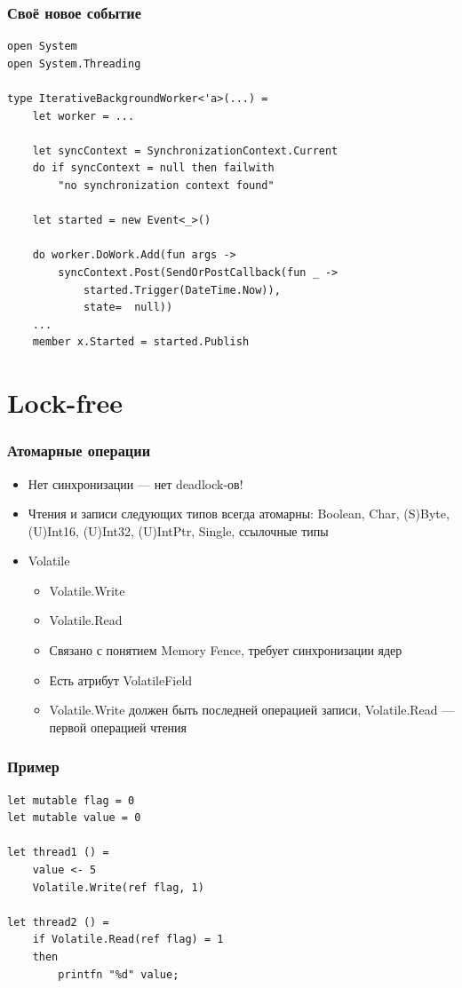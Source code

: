 \documentclass[xetex,mathserif,serif]{beamer}
\begin{document}
	\begin{frame}[fragile]
		\frametitle{Своё новое событие}
		\begin{footnotesize}
			\begin{verbatim}
open System
open System.Threading

type IterativeBackgroundWorker<'a>(...) =
    let worker = ...

    let syncContext = SynchronizationContext.Current
    do if syncContext = null then failwith 
        "no synchronization context found"
    
    let started = new Event<_>()

    do worker.DoWork.Add(fun args ->
        syncContext.Post(SendOrPostCallback(fun _ -> 
            started.Trigger(DateTime.Now)),
            state=  null))
    ...
    member x.Started = started.Publish
			\end{verbatim}
		\end{footnotesize}
\end{frame}

	\section{Lock-free}

	\begin{frame}
		\frametitle{Атомарные операции}
		\begin{itemize}
			\item Нет синхронизации --- нет deadlock-ов!
			\item Чтения и записи следующих типов всегда атомарны: Boolean, Char, (S)Byte, (U)Int16, (U)Int32, (U)IntPtr, Single, ссылочные типы
			\item Volatile
			\begin{itemize}
				\item Volatile.Write
				\item Volatile.Read
				\item Связано с понятием Memory Fence, требует синхронизации ядер
				\item Есть атрибут VolatileField
				\item Volatile.Write должен быть последней операцией записи, Volatile.Read --- первой операцией чтения
			\end{itemize}
		\end{itemize}
	\end{frame}

	\begin{frame}[fragile]
		\frametitle{Пример}
		\begin{verbatim}
let mutable flag = 0
let mutable value = 0

let thread1 () = 
    value <- 5
    Volatile.Write(ref flag, 1)

let thread2 () =
    if Volatile.Read(ref flag) = 1 
    then
        printfn "%d" value;
		\end{verbatim}
\end{frame}
\end{document}

